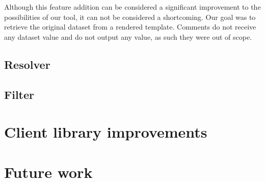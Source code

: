 \documentclass[thesis.tex]{subfiles}
\begin{document}
Although this feature addition can be considered a significant improvement to
the possibilities of our tool, it can not be considered a shortcoming.
Our goal was to retrieve the original dataset from a rendered template.
Comments do not receive any dataset value and do not output any value, as such
they were out of scope.

\subsection{Resolver}

\subsection{Filter}

\section{Client library improvements}

\section{Future work}
\end{document}
